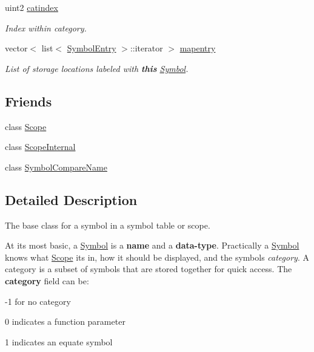 \begin{DoxyCompactItemize}
uint2 \mbox{\hyperlink{class_symbol_a3f20efe66a14d812fd95a57c3a0497cd}{catindex}}
\begin{DoxyCompactList}\small\item\em Index within category. \end{DoxyCompactList}\item 
vector$<$ list$<$ \mbox{\hyperlink{class_symbol_entry}{Symbol\+Entry}} $>$\+::iterator $>$ \mbox{\hyperlink{class_symbol_af272879c187d3158f51e8ed58641f7b5}{mapentry}}
\begin{DoxyCompactList}\small\item\em List of storage locations labeled with {\bfseries{this}} \mbox{\hyperlink{class_symbol}{Symbol}}. \end{DoxyCompactList}\end{DoxyCompactItemize}
\subsection*{Friends}
\begin{DoxyCompactItemize}
\item 
class \mbox{\hyperlink{class_symbol_a921193447f6e42f596ac0a7694b02830}{Scope}}
\item 
class \mbox{\hyperlink{class_symbol_ac98dfa3807028fa4c8b288caf93501fc}{Scope\+Internal}}
\item 
class \mbox{\hyperlink{class_symbol_ad07a9e8085d45ac5b2f79a212fb1443d}{Symbol\+Compare\+Name}}
\end{DoxyCompactItemize}


\subsection{Detailed Description}
The base class for a symbol in a symbol table or scope. 

At its most basic, a \mbox{\hyperlink{class_symbol}{Symbol}} is a {\bfseries{name}} and a {\bfseries{data-\/type}}. Practically a \mbox{\hyperlink{class_symbol}{Symbol}} knows what \mbox{\hyperlink{class_scope}{Scope}} its in, how it should be displayed, and the symbols {\itshape category}. A category is a subset of symbols that are stored together for quick access. The {\bfseries{category}} field can be\+:
\begin{DoxyItemize}
\item -\/1 for no category
\item 0 indicates a function parameter
\item 1 indicates an equate symbol 
\end{DoxyItemize}


